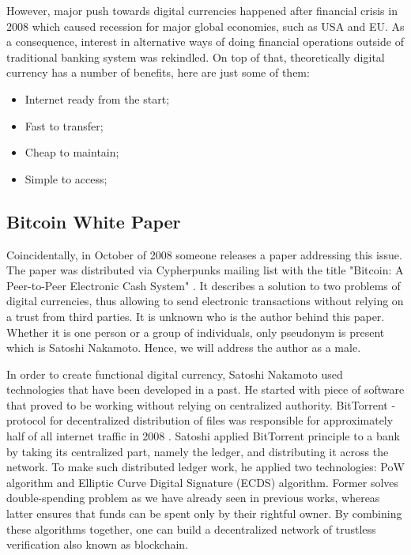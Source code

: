 \documentclass[conference,compsoc]{IEEEtran}
\begin{document}
However, major push towards digital currencies happened after financial crisis in 2008 which caused recession for major global economies, such as USA and EU.
As a consequence, interest in alternative ways of doing financial operations outside of traditional banking system was rekindled. 
On top of that, theoretically digital currency has a number of benefits, here are just some of them:
\begin{itemize}
  \item Internet ready from the start;
  \item Fast to transfer;
  \item Cheap to maintain;
  \item Simple to access;
\end{itemize}


\subsection{Bitcoin White Paper}
Coincidentally, in October of 2008 someone releases a paper addressing this issue. 
The paper was distributed via Cypherpunks mailing list with the title "Bitcoin: A Peer-to-Peer Electronic Cash System" \cite{whitepaper}. 
It describes a solution to two problems of digital currencies, thus allowing to send electronic transactions without relying on a trust from third parties. 
It is unknown who is the author behind this paper. 
Whether it is one person or a group of individuals, only pseudonym is present which is Satoshi Nakamoto. Hence, we will address the author as a male.

In order to create functional digital currency, Satoshi Nakamoto used technologies that have been developed in a past. 
He started with piece of software that proved to be working without relying on centralized authority.    
BitTorrent - protocol for decentralized distribution of files was responsible for approximately half of all internet traffic in 2008 \cite{p2p}. 
Satoshi applied BitTorrent principle to a bank by taking its centralized part, namely the ledger, and distributing it across the network. 
To make such distributed ledger work, he applied two technologies: PoW algorithm and Elliptic Curve Digital Signature (ECDS) algorithm.
Former solves double-spending problem as we have already seen in previous works, whereas latter ensures that funds can be spent only by their rightful owner.
By combining these algorithms together, one can build a decentralized network of trustless verification also known as blockchain. 
\end{document}
